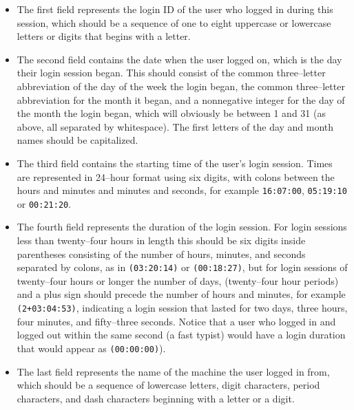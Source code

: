 \documentclass[11pt]{article}
\begin{document}
        \begin{itemize}

          \addtolength{\itemsep}{-1mm}

          \item The first field represents the login ID of the user who
                logged in during this session, which should be a sequence of
                one to eight uppercase or lowercase letters or digits that
                begins with a letter.

          \item The second field contains the date when the user logged on,
                which is the day their login session began.  This should
                consist of the common three--letter abbreviation of the day
                of the week the login began, the common three--letter
                abbreviation for the month it began, and a nonnegative
                integer for the day of the month the login began, which will
                obviously be between 1 and 31 (as above, all separated by
                whitespace).  The first letters of the day and month names
                should be capitalized.

          \item The third field contains the starting time of the user's
                login session.  Times are represented in 24--hour format
                using six digits, with colons between the hours and minutes
                and minutes and seconds, for example \texttt{16:07:00},
                \texttt{05:19:10} or \texttt{00:21:20}.

          \item The fourth field represents the duration of the login
                session.  For login sessions less than twenty--four hours in
                length this should be six digits inside parentheses
                consisting of the number of hours, minutes, and seconds
                separated by colons, as in \texttt{(03:20:14)} or
                \texttt{(00:18:27)}, but for login sessions of twenty--four
                hours or longer the number of days, (twenty--four hour
                periods) and a plus sign should precede the number of hours
                and minutes, for example \texttt{(2+03:04:53)}, indicating a
                login session that lasted for two days, three hours, four
                minutes, and fifty--three seconds.  Notice that a user who
                logged in and logged out within the same second (a fast
                typist) would have a login duration that would appear as
                \texttt{(00:00:00)}).

          \item The last field represents the name of the machine the user
                logged in from, which should be a sequence of lowercase
                letters, digit characters, period characters, and dash
                characters beginning with a letter or a digit.

        \end{itemize}
\end{document}
